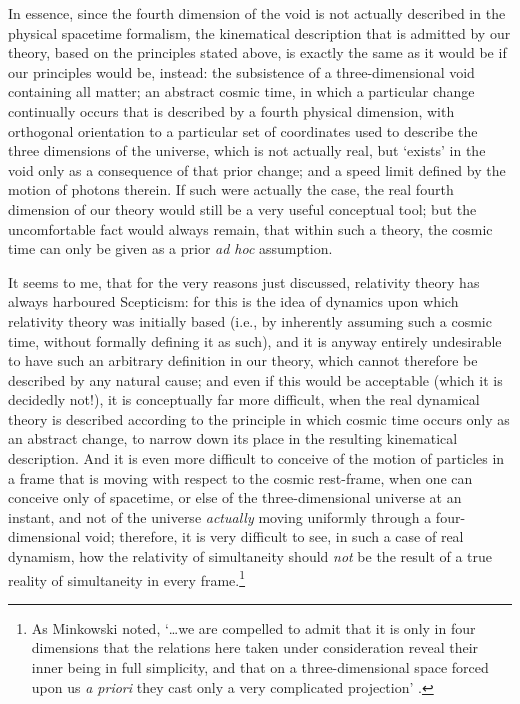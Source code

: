 In essence, since the fourth dimension of the void is not actually described in the physical spacetime formalism, the kinematical description that is admitted by our theory, based on the principles stated above, is exactly the same as it would be if our principles would be, instead: the subsistence of a three-dimensional void containing all matter; an abstract cosmic time, in which a particular change continually occurs that is described by a fourth physical dimension, with orthogonal orientation to a particular set of coordinates used to describe the three dimensions of the universe, which is not actually real, but `exists' in the void only as a consequence of that prior change; and a speed limit defined by the motion of photons therein. If such were actually the case, the real fourth dimension of our theory would still be a very useful conceptual tool; but the uncomfortable fact would always remain, that within such a theory, the cosmic time can only be given as a prior \textit{ad hoc} assumption.

It seems to me, that for the very reasons just discussed, relativity theory has always harboured Scepticism: for this is the idea of dynamics upon which relativity theory was initially based (i.e., by inherently assuming such a cosmic time, without formally defining it as such), and it is anyway entirely undesirable to have such an arbitrary definition in our theory, which cannot therefore be described by any natural cause; and even if this would be acceptable (which it is decidedly not!), it is conceptually far more difficult, when the real dynamical theory is described according to the principle in which cosmic time occurs only as an abstract change, to narrow down its place in the resulting kinematical description. And it is even more difficult to conceive of the motion of particles in a frame that is moving with respect to the cosmic rest-frame, when one can conceive only of spacetime, or else of the three-dimensional universe at an instant, and not of the universe \textit{actually} moving uniformly through a four-dimensional void; therefore, it is very difficult to see, in such a case of real dynamism, how the relativity of simultaneity should \textit{not} be the result of a true reality of simultaneity in every frame.\footnote{As Minkowski noted, `\ldots we are compelled to admit that it is only in four dimensions that the relations here taken under consideration reveal their inner being in full simplicity, and that on a three-dimensional space forced upon us \textit{a priori} they cast only a very complicated projection' \cite{Einstein1952}.}

